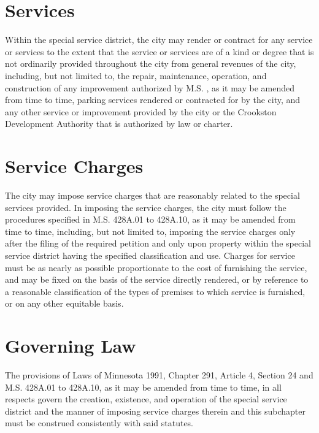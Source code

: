\section{Services}
Within the special service district, the city may render or contract for any service or services to the extent that the service or services are of a kind or degree that is not ordinarily provided throughout the city from general revenues of the city, including, but not limited to, the repair, maintenance, operation, and construction of any improvement authorized by M.S. , as it may be amended from time to time, parking services rendered or contracted for by the city, and any other service or improvement provided by the city or the Crookston Development Authority that is authorized by law or charter.

\section{Service Charges}
The city may impose service charges that are reasonably related to the special services provided.  In imposing the service charges, the city must follow the procedures specified in M.S. \textsection 428A.01 to \textsection 428A.10, as it may be amended from time to time, including, but not limited to, imposing the service charges only after the filing of the required petition and only upon property within the special service district having the specified classification and use.  Charges for service must be as nearly as possible proportionate to the cost of furnishing the service, and may be fixed on the basis of the service directly rendered, or by reference to a reasonable classification of the types of premises to which service is furnished, or on any other equitable basis.

\section{Governing Law}
The provisions of Laws of Minnesota 1991, Chapter 291, Article 4, Section 24 and M.S. \textsection 428A.01 to \textsection 428A.10, as it may be amended from time to time, in all respects govern the creation, existence, and operation of the special service district and the manner of imposing service charges therein and this subchapter must be construed consistently with said statutes.



